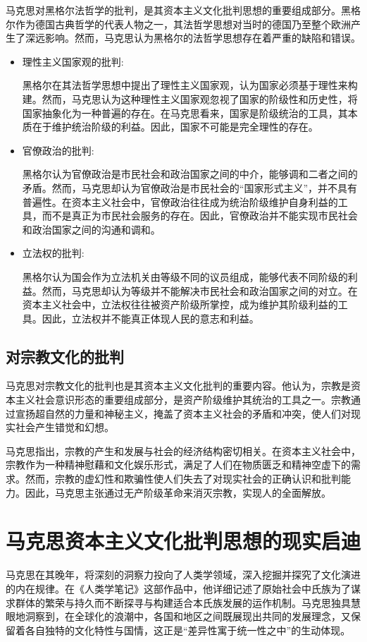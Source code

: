 马克思对黑格尔法哲学的批判，是其资本主义文化批判思想的重要组成部分。黑格尔作为德国古典哲学的代表人物之一，其法哲学思想对当时的德国乃至整个欧洲产生了深远影响。然而，马克思认为黑格尔的法哲学思想存在着严重的缺陷和错误。
\begin{itemize}
    \item {\heiti 理性主义国家观的批判:}
    
    \qquad 黑格尔在其法哲学思想中提出了理性主义国家观，认为国家必须基于理性来构建。然而，马克思认为这种理性主义国家观忽视了国家的阶级性和历史性，将国家抽象化为一种普遍的存在。在马克思看来，国家是阶级统治的工具，其本质在于维护统治阶级的利益。因此，国家不可能是完全理性的存在。

    \item {\heiti 官僚政治的批判:}
    
    \qquad 黑格尔认为官僚政治是市民社会和政治国家之间的中介，能够调和二者之间的矛盾。然而，马克思却认为官僚政治是市民社会的“国家形式主义”，并不具有普遍性。在资本主义社会中，官僚政治往往成为统治阶级维护自身利益的工具，而不是真正为市民社会服务的存在。因此，官僚政治并不能实现市民社会和政治国家之间的沟通和调和。

    \item {\heiti 立法权的批判:}  
    
    \qquad 黑格尔认为国会作为立法机关由等级不同的议员组成，能够代表不同阶级的利益。然而，马克思却认为等级并不能解决市民社会和政治国家之间的对立。在资本主义社会中，立法权往往被资产阶级所掌控，成为维护其阶级利益的工具。因此，立法权并不能真正体现人民的意志和利益。

\end{itemize}

\subsection{对宗教文化的批判}
马克思对宗教文化的批判也是其资本主义文化批判的重要内容。他认为，宗教是资本主义社会意识形态的重要组成部分，是资产阶级维护其统治的工具之一。宗教通过宣扬超自然的力量和神秘主义，掩盖了资本主义社会的矛盾和冲突，使人们对现实社会产生错觉和幻想。

马克思指出，宗教的产生和发展与社会的经济结构密切相关。在资本主义社会中，宗教作为一种精神慰藉和文化娱乐形式，满足了人们在物质匮乏和精神空虚下的需求。然而，宗教的虚幻性和欺骗性使人们失去了对现实社会的正确认识和批判能力。因此，马克思主张通过无产阶级革命来消灭宗教，实现人的全面解放。

\newpage
\section{马克思资本主义文化批判思想的现实启迪}
马克思在其晚年，将深刻的洞察力投向了人类学领域，深入挖掘并探究了文化演进的内在规律。在《人类学笔记》这部作品中，他详细记述了原始社会中氏族为了谋求群体的繁荣与持久而不断探寻与构建适合本氏族发展的运作机制。马克思独具慧眼地洞察到，在全球化的浪潮中，各国和地区之间既展现出共同的发展理念，又保留着各自独特的文化特性与国情，这正是“差异性寓于统一性之中”的生动体现。

